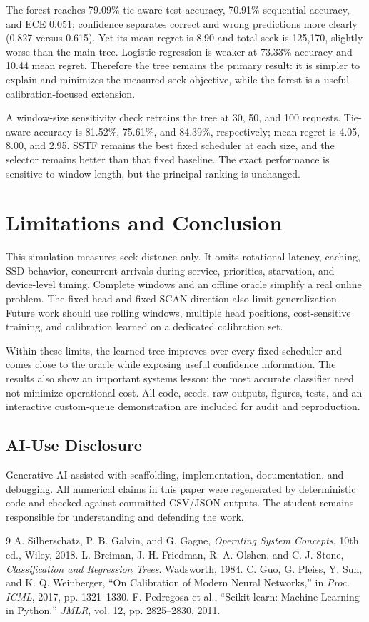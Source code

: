 \documentclass[10pt,a4paper]{article}
\begin{document}
The forest reaches 79.09\% tie-aware test accuracy, 70.91\% sequential accuracy, and ECE 0.051; confidence separates correct and wrong predictions more clearly (0.827 versus 0.615). Yet its mean regret is 8.90 and total seek is 125,170, slightly worse than the main tree. Logistic regression is weaker at 73.33\% accuracy and 10.44 mean regret. Therefore the tree remains the primary result: it is simpler to explain and minimizes the measured seek objective, while the forest is a useful calibration-focused extension.

A window-size sensitivity check retrains the tree at 30, 50, and 100 requests. Tie-aware accuracy is 81.52\%, 75.61\%, and 84.39\%, respectively; mean regret is 4.05, 8.00, and 2.95. SSTF remains the best fixed scheduler at each size, and the selector remains better than that fixed baseline. The exact performance is sensitive to window length, but the principal ranking is unchanged.

\section{Limitations and Conclusion}
This simulation measures seek distance only. It omits rotational latency, caching, SSD behavior, concurrent arrivals during service, priorities, starvation, and device-level timing. Complete windows and an offline oracle simplify a real online problem. The fixed head and fixed SCAN direction also limit generalization. Future work should use rolling windows, multiple head positions, cost-sensitive training, and calibration learned on a dedicated calibration set.

Within these limits, the learned tree improves over every fixed scheduler and comes close to the oracle while exposing useful confidence information. The results also show an important systems lesson: the most accurate classifier need not minimize operational cost. All code, seeds, raw outputs, figures, tests, and an interactive custom-queue demonstration are included for audit and reproduction.

\subsection*{AI-Use Disclosure}
Generative AI assisted with scaffolding, implementation, documentation, and debugging. All numerical claims in this paper were regenerated by deterministic code and checked against committed CSV/JSON outputs. The student remains responsible for understanding and defending the work.

\begin{thebibliography}{9}\small
{} A. Silberschatz, P. B. Galvin, and G. Gagne, \emph{Operating System Concepts}, 10th ed., Wiley, 2018.
 L. Breiman, J. H. Friedman, R. A. Olshen, and C. J. Stone, \emph{Classification and Regression Trees}. Wadsworth, 1984.
 C. Guo, G. Pleiss, Y. Sun, and K. Q. Weinberger, ``On Calibration of Modern Neural Networks,'' in \emph{Proc. ICML}, 2017, pp. 1321--1330.
 F. Pedregosa et al., ``Scikit-learn: Machine Learning in Python,'' \emph{JMLR}, vol. 12, pp. 2825--2830, 2011.
\end{thebibliography}
\end{document}
